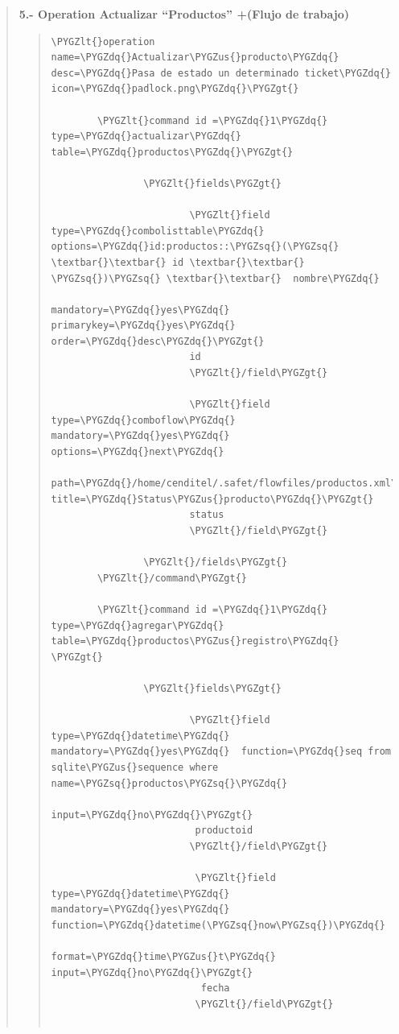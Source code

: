 \documentclass[letterpaper,11pt,spanish]{sphinxmanual}
\def\PYGZus{\char`\_}
\def\PYGZlt{\char`\<}
\def\PYGZgt{\char`\>}
\def\PYGZsq{\char`\'}
\def\PYGZdq{\char`\"}
\begin{document}
\begin{quote}
\textbf{5.- Operation Actualizar ``Productos'' +(Flujo de trabajo)}
\begin{quote}

\begin{Verbatim}[commandchars=\\\{\}]
\PYGZlt{}operation  name=\PYGZdq{}Actualizar\PYGZus{}producto\PYGZdq{} desc=\PYGZdq{}Pasa de estado un determinado ticket\PYGZdq{} icon=\PYGZdq{}padlock.png\PYGZdq{}\PYGZgt{}

        \PYGZlt{}command id =\PYGZdq{}1\PYGZdq{} type=\PYGZdq{}actualizar\PYGZdq{} table=\PYGZdq{}productos\PYGZdq{}\PYGZgt{}

                \PYGZlt{}fields\PYGZgt{}

                        \PYGZlt{}field type=\PYGZdq{}combolisttable\PYGZdq{} options=\PYGZdq{}id:productos::\PYGZsq{}(\PYGZsq{} \textbar{}\textbar{} id \textbar{}\textbar{} \PYGZsq{})\PYGZsq{} \textbar{}\textbar{}  nombre\PYGZdq{}
                                                        mandatory=\PYGZdq{}yes\PYGZdq{} primarykey=\PYGZdq{}yes\PYGZdq{} order=\PYGZdq{}desc\PYGZdq{}\PYGZgt{}
                        id
                        \PYGZlt{}/field\PYGZgt{}

                        \PYGZlt{}field type=\PYGZdq{}comboflow\PYGZdq{} mandatory=\PYGZdq{}yes\PYGZdq{} options=\PYGZdq{}next\PYGZdq{}
                                path=\PYGZdq{}/home/cenditel/.safet/flowfiles/productos.xml\PYGZdq{} title=\PYGZdq{}Status\PYGZus{}producto\PYGZdq{}\PYGZgt{}
                        status
                        \PYGZlt{}/field\PYGZgt{}

                \PYGZlt{}/fields\PYGZgt{}
        \PYGZlt{}/command\PYGZgt{}

        \PYGZlt{}command id =\PYGZdq{}1\PYGZdq{} type=\PYGZdq{}agregar\PYGZdq{} table=\PYGZdq{}productos\PYGZus{}registro\PYGZdq{} \PYGZgt{}

                \PYGZlt{}fields\PYGZgt{}

                        \PYGZlt{}field type=\PYGZdq{}datetime\PYGZdq{} mandatory=\PYGZdq{}yes\PYGZdq{}  function=\PYGZdq{}seq from sqlite\PYGZus{}sequence where name=\PYGZsq{}productos\PYGZsq{}\PYGZdq{}
                                                                                                                input=\PYGZdq{}no\PYGZdq{}\PYGZgt{}
                         productoid
                        \PYGZlt{}/field\PYGZgt{}

                         \PYGZlt{}field type=\PYGZdq{}datetime\PYGZdq{} mandatory=\PYGZdq{}yes\PYGZdq{}  function=\PYGZdq{}datetime(\PYGZsq{}now\PYGZsq{})\PYGZdq{}
                                                                format=\PYGZdq{}time\PYGZus{}t\PYGZdq{} input=\PYGZdq{}no\PYGZdq{}\PYGZgt{}
                          fecha
                         \PYGZlt{}/field\PYGZgt{}


\end{Verbatim}
\end{quote}
\end{quote}
\end{document}
